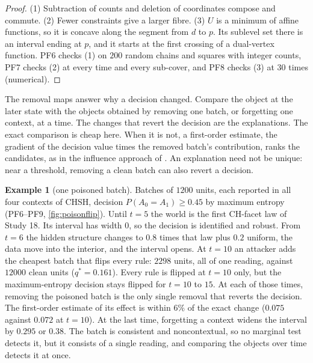 \documentclass[11pt]{article}
\theoremstyle{definition}\newtheorem{definition}[theorem]{Definition}\newtheorem{remark}[theorem]{Remark}\newtheorem{example}[theorem]{Example}\newtheorem{problem}[theorem]{Open problem}\crefname{problem}{Problem}{Problems}
\begin{document}
\begin{proof}
(1) Subtraction of counts and deletion of coordinates compose and commute. (2) Fewer constraints give a larger fibre. (3) $U$ is a minimum of affine functions, so it is concave along the segment from $d$ to $p$. Its sublevel set there is an interval ending at $p$, and it starts at the first crossing of a dual-vertex function. PF6 checks (1) on $200$ random chains and squares with integer counts, PF7 checks (2) at every time and every sub-cover, and PF8 checks (3) at $30$ times (numerical).
\end{proof}

The removal maps answer why a decision changed. Compare the object at the later state with the objects obtained by removing one batch, or forgetting one context, at a time. The changes that revert the decision are the explanations. The exact comparison is cheap here. When it is not, a first-order estimate, the gradient of the decision value times the removed batch's contribution, ranks the candidates, as in the influence approach of \cite{BroderickGiordanoMeager2020}. An explanation need not be unique: near a threshold, removing a clean batch can also revert a decision.

\begin{example}[one poisoned batch]\label{ex:poisonstream}
Batches of $1200$ units, each reported in all four contexts of CHSH, decision $P(A_0=A_1)\ge0.45$ by maximum entropy (PF6--PF9, \cref{fig:poisonflip}). Until $t=5$ the world is the first CH-facet law of Study 18. Its interval has width $0$, so the decision is identified and robust. From $t=6$ the hidden structure changes to $0.8$ times that law plus $0.2$ uniform, the data move into the interior, and the interval opens. At $t=10$ an attacker adds the cheapest batch that flips every rule: $2298$ units, all of one reading, against $12000$ clean units ($q^*=0.161$). Every rule is flipped at $t=10$ only, but the maximum-entropy decision stays flipped for $t=10$ to $15$. At each of those times, removing the poisoned batch is the only single removal that reverts the decision. The first-order estimate of its effect is within $6\%$ of the exact change ($0.075$ against $0.072$ at $t=10$). At the last time, forgetting a context widens the interval by $0.295$ or $0.38$. The batch is consistent and noncontextual, so no marginal test detects it, but it consists of a single reading, and comparing the objects over time detects it at once.
\end{example}
\end{document}
